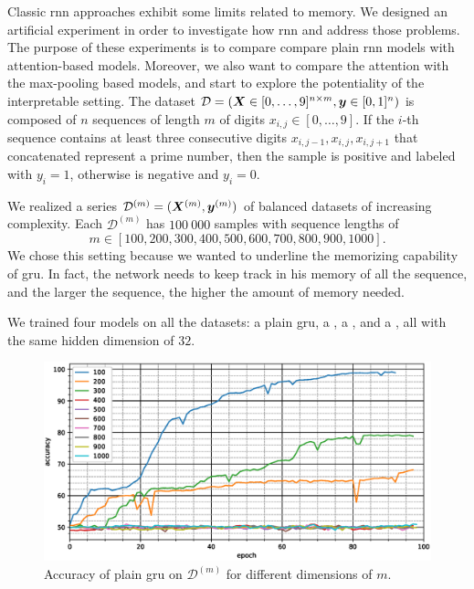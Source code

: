Classic \ac{rnn} approaches exhibit some limits related to
memory. We designed an artificial experiment in
order to investigate how \ac{rnn} and \maxp{} address those
problems. The purpose of these experiments is to compare compare plain
\ac{rnn} models with attention-based models. Moreover, we also want to
compare the attention with the max-pooling based models, and start to
explore the potentiality of the interpretable setting. The dataset 
$\mathcal{D}=(\bm{X}\in [0,\dots,9]^{n\times m},\bm{y}\in [0,1]^n)$ is
composed of $n$ sequences of length
$m$ of digits $x_{i,j}\in[0,\dots,9]$. If the $i$-th sequence contains
at least three consecutive digits
$x_{i,j-1},x_{i,j},x_{i,j+1}$ that concatenated represent a prime
number, then the
sample is positive and labeled with $y_i=1$, otherwise is negative and
$y_i=0$.

We realized a series
$\mathcal{D}^{(m)}=(\bm{X}^{(m)},\bm{y}^{(m)})$ of balanced
datasets of increasing complexity. Each $\mathcal{D}^{(m)}$ has $100\ 000$
samples with 
sequence lengths of
$$
m\in[100,200,300,400,500,600,700,800,900,1000].$$
We chose this setting because we wanted to underline the memorizing
capability of \ac{gru}. In fact, the network needs to keep track in
his memory of
all the sequence, and the larger the sequence, the higher the amount of
memory needed.

We trained four models on
all the datasets: a plain \ac{gru}, a
\maxp{}, a \softmax{}, and a \maxi{}, all with the same hidden dimension of $32$. 

\begin{figure}
  \centering
  \includegraphics[width=\floatwidth]{imgMax/accuracy-base.eps}
  \caption{Accuracy of plain \ac{gru} on $\mathcal{D}^{(m)}$ for different dimensions of $m$.}
  \label{fig:testAccBase}
\end{figure}

